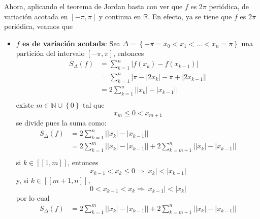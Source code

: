 \documentclass[12pt]{report}
\theoremstyle{largebreak}
\renewcommand{\leq}{\ensuremath{\leqslant}}
\newcommand\abs[1]{\ensuremath{\left|#1\right|}}
\newcommand{\natint}[1]{\ensuremath{\left[\!\left[#1\right]\!\right]}}
\begin{document}
\begin{sol}
        Ahora, aplicando el teorema de Jordan basta con ver que $f$ es $2\pi$ periódica, de variación acotada en $[-\pi,\pi]$ y continua en $\mathbb{R}$. En efecto, ya se tiene que $f$ es $2\pi$ periódica, veamos que
        \begin{itemize}
            \item \textbf{$f$ es de variación acotada}: Sea $\Delta=\left\{-\pi=x_0<x_1<...<x_n=\pi \right\}$ una partición del intervalo $[-\pi,\pi]$, entonces
            \begin{equation*}
                \begin{split}
                    S_\Delta(f)&=\sum_{ k=1}^n\abs{f(x_k)-f(x_{k-1})}\\
                    &=\sum_{ k=1}^n\abs{\pi-\abs{2x_k}-\pi+\abs{2x_{ k-1}}}\\
                    &=2\sum_{ k=1}^n\abs{\abs{x_k}-\abs{x_{ k-1}}}\\
                \end{split}
            \end{equation*}
            existe $m\in\mathbb{N}\cup\left\{0\right\}$ tal que
            \begin{equation*}
                x_{m}\leq0<x_{ m+1}
            \end{equation*}
            se divide pues la suma como:
            \begin{equation*}
                \begin{split}
                    S_\Delta(f)&=2\sum_{ k=1}^n\abs{\abs{x_k}-\abs{x_{ k-1}}}\\
                    &=2\sum_{ k=1}^m\abs{\abs{x_k}-\abs{x_{ k-1}}}+2\sum_{ k=m+1}^n\abs{\abs{x_k}-\abs{x_{ k-1}}}\\
                \end{split}
            \end{equation*}
            si $k\in\natint{1,m}$, entonces
            \begin{equation*}
                x_{ k-1}<x_k\leq0\Rightarrow \abs{x_k}<\abs{x_{ k-1}}
            \end{equation*}
            y, si $k\in\natint{m+1,n}$,
            \begin{equation*}
                0<x_{ k-1}<x_{k}\Rightarrow \abs{x_{ k-1}}<\abs{x_k}
            \end{equation*}
            por lo cual
            \begin{equation*}
                \begin{split}
                    S_\Delta(f)&=2\sum_{ k=1}^m\abs{\abs{x_k}-\abs{x_{ k-1}}}+2\sum_{ k=m+1}^n\abs{\abs{x_k}-\abs{x_{ k-1}}}\\

\end{split}
\end{equation*}
\end{itemize}
\end{sol}
\end{document}

